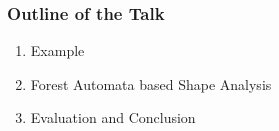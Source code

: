\documentclass{beamer}
\begin{document}
\begin{frame}
\frametitle{Outline of the Talk}

	\begin{enumerate}
		\item Example
		\item Forest Automata based Shape Analysis
		\item Evaluation and Conclusion
	\end{enumerate}

\end{frame}


\end{document}
